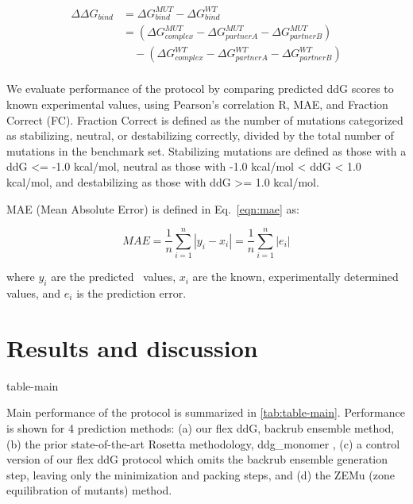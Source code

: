 \begin{equation}\label{eqn:split-ddg}
  \begin{split}
    {\Delta\Delta}G_{bind} & ={\Delta}G^{MUT}_{bind} - {\Delta}G^{WT}_{bind}\\
    & =({\Delta}G^{MUT}_{complex} - {\Delta}G^{MUT}_{partner A} - {\Delta}G^{MUT}_{partner B})\\
    & \quad - ({\Delta}G^{WT}_{complex} - {\Delta}G^{WT}_{partner A} - {\Delta}G^{WT}_{partner B})\\
  \end{split}
\end{equation}

We evaluate performance of the protocol by comparing predicted ddG scores to known experimental values, using Pearson's correlation R, MAE, and Fraction Correct (FC). Fraction Correct is defined as the number of mutations categorized as stabilizing, neutral, or destabilizing correctly, divided by the total number of mutations in the benchmark set. Stabilizing mutations are defined as those with a ddG <= -1.0 kcal/mol, neutral as those with -1.0 kcal/mol < ddG < 1.0 kcal/mol, and destabilizing as those with ddG >= 1.0 kcal/mol.

MAE (Mean Absolute Error) is defined in Eq.~\ref{eqn:mae} as:

\begin{equation}\label{eqn:mae}
  MAE = \dfrac{1}{n}\sum\limits_{i=1}^n|y_i-x_i| = \dfrac{1}{n}\sum\limits_{i=1}^n|e_i|
\end{equation}

where $y_i$ are the predicted \ddg\ values, $x_i$ are the known, experimentally determined values, and $e_i$ is the prediction error.

\section{Results and discussion}

{table-main}

Main performance of the protocol is summarized in \cref{tab:table-main}. Performance is shown for 4 prediction methods: (a) our flex ddG, backrub ensemble method, (b) the prior state-of-the-art Rosetta methodology, ddg\_monomer \cite{kellogg_role_2011}, (c) a control version of our flex ddG protocol which omits the backrub ensemble generation step, leaving only the minimization and packing steps, and (d) the ZEMu (zone equilibration of mutants) method\cite{dourado_multiscale_2014}.

